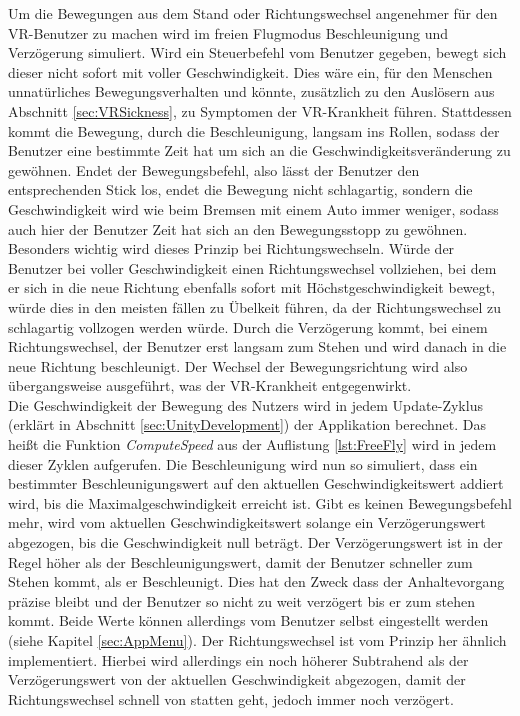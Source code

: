 Um die Bewegungen aus dem Stand oder Richtungswechsel angenehmer für den VR-Benutzer zu machen wird im freien Flugmodus Beschleunigung und Verzögerung simuliert. Wird ein Steuerbefehl vom Benutzer gegeben, bewegt sich dieser nicht sofort mit voller Geschwindigkeit. Dies wäre ein, für den Menschen unnatürliches Bewegungsverhalten und könnte, zusätzlich zu den Auslösern aus Abschnitt \ref{sec:VRSickness}, zu Symptomen der VR-Krankheit führen. Stattdessen kommt die Bewegung, durch die Beschleunigung, langsam ins Rollen, sodass der Benutzer eine bestimmte Zeit hat um sich an die Geschwindigkeitsveränderung zu gewöhnen. Endet der Bewegungsbefehl, also lässt der Benutzer den entsprechenden Stick los, endet die Bewegung nicht schlagartig, sondern die Geschwindigkeit wird wie beim Bremsen mit einem Auto immer weniger, sodass auch hier der Benutzer Zeit hat sich an den Bewegungsstopp zu gewöhnen.      Besonders wichtig wird dieses Prinzip bei Richtungswechseln. Würde der Benutzer bei voller Geschwindigkeit einen Richtungswechsel vollziehen, bei dem er sich in die neue Richtung ebenfalls sofort mit Höchstgeschwindigkeit bewegt, würde dies in den meisten fällen zu Übelkeit führen, da der Richtungswechsel zu schlagartig vollzogen werden würde. Durch die Verzögerung kommt, bei einem Richtungswechsel, der Benutzer erst langsam zum Stehen und wird danach in die neue Richtung beschleunigt. Der Wechsel der Bewegungsrichtung wird also übergangsweise ausgeführt, was der VR-Krankheit entgegenwirkt. \\

Die Geschwindigkeit der Bewegung des Nutzers wird in jedem Update-Zyklus (erklärt in Abschnitt \ref{sec:UnityDevelopment}) der Applikation berechnet. Das heißt die Funktion \textit{ComputeSpeed} aus der Auflistung \ref{lst:FreeFly} wird in jedem dieser Zyklen aufgerufen. Die Beschleunigung wird nun so simuliert, dass ein bestimmter Beschleunigungswert auf den aktuellen Geschwindigkeitswert addiert wird, bis die Maximalgeschwindigkeit erreicht ist. Gibt es keinen Bewegungsbefehl mehr, wird vom aktuellen Geschwindigkeitswert solange ein Verzögerungswert abgezogen, bis die Geschwindigkeit null beträgt. Der Verzögerungswert ist in der Regel höher als der Beschleunigungswert, damit der Benutzer schneller zum Stehen kommt, als er Beschleunigt. Dies hat den Zweck dass der Anhaltevorgang präzise bleibt und der Benutzer so nicht zu weit verzögert bis er zum stehen kommt. Beide Werte können allerdings vom Benutzer selbst eingestellt werden (siehe Kapitel \ref{sec:AppMenu}). Der Richtungswechsel ist vom Prinzip her ähnlich implementiert. Hierbei wird allerdings ein noch höherer Subtrahend als der Verzögerungswert von der aktuellen Geschwindigkeit abgezogen, damit der Richtungswechsel schnell von statten geht, jedoch immer noch verzögert.


